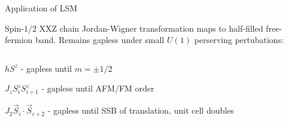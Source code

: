 \begin{frame}{Application of LSM}
\vskip-1.5cm
\begin{block}{Spin-$1/2$ XXZ chain}
Jordan-Wigner transformation maps to half-filled free-fermion band.
Remains gapless under small $U(1)$ perserving pertubations:
\end{block}
\begin{columns}[T]
    \begin{column}[T]{.53\textwidth}
        \bi
        \item<2-> $h S^z$ - gapless until $m=\pm 1/2$
        \item<3-> $J_z S^z_i S^z_{i+1}$ - gapless until AFM/FM order
        \item<4-> $J_2 \vec{S}_i \cdot \vec{S}_{i+2}$ - gapless until SSB of translation, unit cell doubles
        \ei 
    \end{column}
    \begin{column}[T]{.47\textwidth}
\end{column}
\end{columns}
\end{frame}
